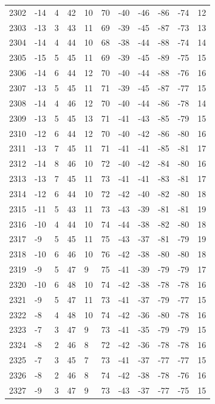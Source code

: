 \begin{table}[H]
\begin{tabular}{lllllllllll}
2302 & -14 & 4 & 42 & 10 & 70 & -40 & -46 & -86 & -74 & 12 \\
2303 & -13 & 3 & 43 & 11 & 69 & -39 & -45 & -87 & -73 & 13 \\
2304 & -14 & 4 & 44 & 10 & 68 & -38 & -44 & -88 & -74 & 14 \\
2305 & -15 & 5 & 45 & 11 & 69 & -39 & -45 & -89 & -75 & 15 \\
2306 & -14 & 6 & 44 & 12 & 70 & -40 & -44 & -88 & -76 & 16 \\
2307 & -13 & 5 & 45 & 11 & 71 & -39 & -45 & -87 & -77 & 15 \\
2308 & -14 & 4 & 46 & 12 & 70 & -40 & -44 & -86 & -78 & 14 \\
2309 & -13 & 5 & 45 & 13 & 71 & -41 & -43 & -85 & -79 & 15 \\
2310 & -12 & 6 & 44 & 12 & 70 & -40 & -42 & -86 & -80 & 16 \\
2311 & -13 & 7 & 45 & 11 & 71 & -41 & -41 & -85 & -81 & 17 \\
2312 & -14 & 8 & 46 & 10 & 72 & -40 & -42 & -84 & -80 & 16 \\
2313 & -13 & 7 & 45 & 11 & 73 & -41 & -41 & -83 & -81 & 17 \\
2314 & -12 & 6 & 44 & 10 & 72 & -42 & -40 & -82 & -80 & 18 \\
2315 & -11 & 5 & 43 & 11 & 73 & -43 & -39 & -81 & -81 & 19 \\
2316 & -10 & 4 & 44 & 10 & 74 & -44 & -38 & -82 & -80 & 18 \\
2317 & -9 & 5 & 45 & 11 & 75 & -43 & -37 & -81 & -79 & 19 \\
2318 & -10 & 6 & 46 & 10 & 76 & -42 & -38 & -80 & -80 & 18 \\
2319 & -9 & 5 & 47 & 9 & 75 & -41 & -39 & -79 & -79 & 17 \\
2320 & -10 & 6 & 48 & 10 & 74 & -42 & -38 & -78 & -78 & 16 \\
2321 & -9 & 5 & 47 & 11 & 73 & -41 & -37 & -79 & -77 & 15 \\
2322 & -8 & 4 & 48 & 10 & 74 & -42 & -36 & -80 & -78 & 16 \\
2323 & -7 & 3 & 47 & 9 & 73 & -41 & -35 & -79 & -79 & 15 \\
2324 & -8 & 2 & 46 & 8 & 72 & -42 & -36 & -78 & -78 & 16 \\
2325 & -7 & 3 & 45 & 7 & 73 & -41 & -37 & -77 & -77 & 15 \\
2326 & -8 & 2 & 46 & 8 & 74 & -42 & -38 & -78 & -76 & 16 \\
2327 & -9 & 3 & 47 & 9 & 73 & -43 & -37 & -77 & -75 & 15 \\

\end{tabular}
\end{table}
